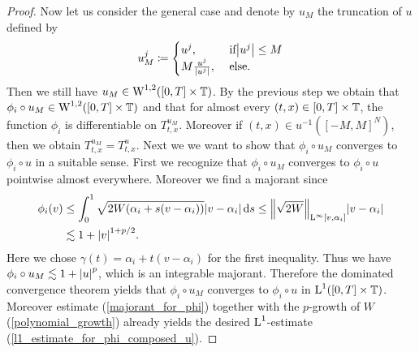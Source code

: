 \begin{proof}
	Now let us consider the general case and denote by $ u_{ M } $ the truncation of $ u $ defined by
	\begin{equation*}
		u_{ M }^{ j } 
		\coloneqq
		\begin{cases}
			u^{ j }, & \text{ if} \abs{ u^{ j } } \leq M 
			\\
			M \frac{ u^{ j } }{ \abs{ u^{ j } } },
			& \text{ else}.
		\end{cases}
	\end{equation*}
	Then we still have $ u_{ M } \in \operatorname{W}^{ 1, 2 } ( [ 0 , T ] \times 
	\operatorname{\mathbb{T}} ) $.
	 By the previous step we obtain that $ \phi_{ i } \circ u_{ M } \in \operatorname{W}^{ 
	 1, 2 } ( [ 0 , T ] \times \operatorname{\mathbb{T}} ) $ and that for almost every $ ( t, 
	 x ) \in [ 0 , T ] \times \operatorname{\mathbb{T}} $, the function $ \phi_{ i } $ is 
	 differentiable on $ T_{ t, x }^{ u_{ M } } $. Moreover if $ ( t, x ) \in 
	 u^{ - 1 } ( [ - M , M ]^{ N } ) $, then we obtain $ T_{ t, x }^{ u_{ M } } 
	 = T_{ t, x }^{ u } $.
	Next we we want to show that $ \phi_{ i } \circ u_{ M } $ converges to $ \phi_{ i } \circ u $ in a suitable sense. First we recognize that $ \phi_{ i } \circ u_{ M } $ converges to $ \phi_{ i } \circ u $ pointwise almost everywhere. Moreover we find a majorant since
	\begin{align}
		\notag
		\phi_{ i } ( v ) 
		&
		\leq
		\int_{ 0 }^{ 1 }
			\sqrt{ 2 W ( \alpha_{ i } + s ( v - \alpha_{ i } ) ) }
			\abs{ v - \alpha_{i } }
		\dd{ s }
		\leq
		\norm{ \sqrt{ 2 W } }_{ \operatorname{L}^{ \infty } [ v, \alpha_{ i } ] }
		\abs{ v - \alpha_{ i } }
		\\
		\label{majorant_for_phi}
		& \lesssim
		1 + \abs{ v }^{ 1 + p/2 }.
	\end{align}
	Here we chose $ \gamma ( t ) = \alpha_{ i } + t ( v - \alpha_{ i } ) $ for 
	the first inequality.
	Thus we have $ \phi_{ i } \circ u_{ M } \lesssim 1 + \abs{ u }^{ p } $, 
	which is an integrable majorant. Therefore the dominated convergence 
	theorem yields that $ \phi_{ i } \circ u_{ M } $ converges to $ \phi_{ i } 
	\circ u $ in $ \operatorname{L}^{ 1 } ( [ 0 , T ] \times \operatorname{\mathbb{T}} ) $.
	Moreover estimate (\ref{majorant_for_phi}) together with the $ p $-growth 
	of $ W $ (\ref{polynomial_growth}) already yields the desired $ \operatorname{L}^{ 1 } 
	$-estimate (\ref{l1_estimate_for_phi_composed_u}).
	

\end{proof}
